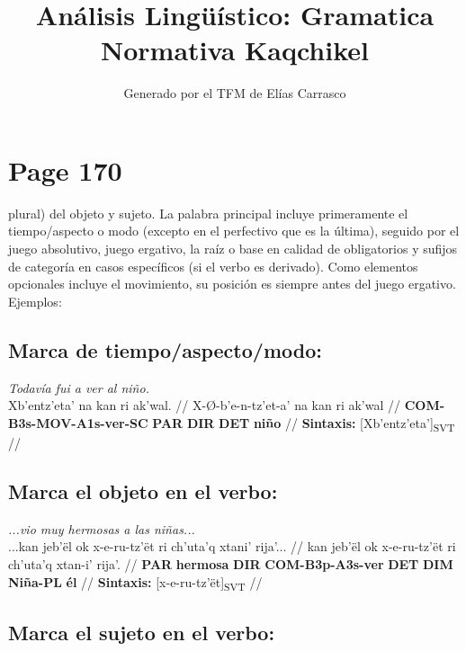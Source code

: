 \documentclass{article}%
\title{Análisis Lingüístico: Gramatica Normativa Kaqchikel}%
\author{Generado por el TFM de Elías Carrasco}%
\begin{document}
%
\normalsize%
\maketitle%
\section{Page 170}%
\label{sec:Page170}%
plural) del objeto y sujeto. La palabra principal incluye primeramente el tiempo/aspecto %
o modo (excepto en el perfectivo que es la última), seguido por el juego absolutivo, %
juego ergativo, la raíz o base en calidad de obligatorios y sufijos de categoría en casos %
específicos (si el verbo es derivado). Como elementos opcionales incluye el movimiento, %
su posición es siempre antes del juego ergativo. Ejemplos: %
\subsection{Marca de tiempo/aspecto/modo:}%
\label{subsec:Marcadetiempo/aspecto/modo}%

%
\par\medskip%
\ex
\textit{Todavía fui a ver al niño.} \\
\begingl
\gla Xb'entz'eta' na kan ri ak'wal. //
\glb X-Ø-b'e-n-tz'et-a' na kan ri ak'wal //
\glc \textbf{COM-}\textbf{B3s-}\textbf{MOV-}\textbf{A1s-}\textbf{ver-}\textbf{SC} \textbf{PAR} \textbf{DIR} \textbf{DET} \textbf{niño} //
\glft \textbf{Sintaxis:} [Xb'entz'eta']\textsubscript{SVT} //
\endgl
\xe
%
\medskip%
\subsection{Marca el objeto en el verbo:}%
\label{subsec:Marcaelobjetoenelverbo}%

%
\par\medskip%
\ex
\textit{...vio muy hermosas a las niñas...} \\
\begingl
\gla ...kan jeb'ël ok x-e-ru-tz'ët ri ch'uta'q xtani' rija'... //
\glb kan jeb'ël ok x-e-ru-tz'ët ri ch'uta'q xtan-i' rija'. //
\glc \textbf{PAR} \textbf{hermosa} \textbf{DIR} \textbf{COM-}\textbf{B3p-}\textbf{A3s-}\textbf{ver} \textbf{DET} \textbf{DIM} \textbf{Niña-PL} \textbf{él} //
\glft \textbf{Sintaxis:} [x-e-ru-tz'ët]\textsubscript{SVT} //
\endgl
\xe
%
\medskip%
\subsection{Marca el sujeto en el verbo:}%
\label{subsec:Marcaelsujetoenelverbo}%
\end{document}
